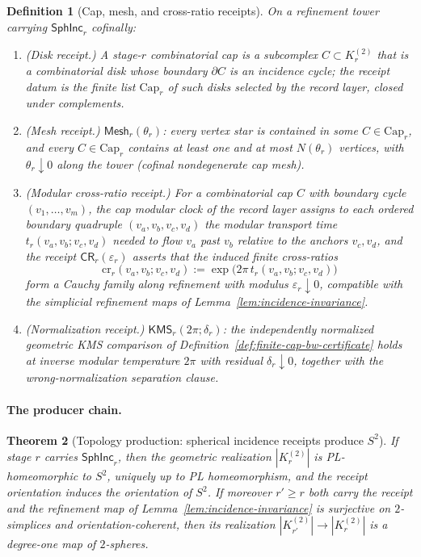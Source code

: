 \documentclass[11pt]{article}
\newtheorem{theorem}{Theorem}[section]
\newtheorem{definition}[theorem]{Definition}
\begin{document}
\begin{definition}[Cap, mesh, and cross-ratio receipts]
\label{def:cap-mesh-crossratio-receipts}
On a refinement tower carrying \(\mathsf{SphInc}_r\) cofinally:
\begin{enumerate}[leftmargin=2em]
\item (\emph{Disk receipt.}) A stage-\(r\) \emph{combinatorial cap} is a
subcomplex \(C\subset K^{(2)}_r\) that is a combinatorial disk whose boundary
\(\partial C\) is an incidence cycle; the receipt datum is the finite list
\(\mathrm{Cap}_r\) of such disks selected by the record layer, closed under
complements.
\item (\emph{Mesh receipt.}) \(\mathsf{Mesh}_r(\theta_r)\): every vertex star
is contained in some \(C\in\mathrm{Cap}_r\), and every \(C\in\mathrm{Cap}_r\)
contains at least one and at most \(N(\theta_r)\) vertices, with
\(\theta_r\downarrow0\) along the tower (cofinal nondegenerate cap mesh).
\item (\emph{Modular cross-ratio receipt.}) For a combinatorial cap \(C\) with
boundary cycle \((v_1,\ldots,v_m)\), the cap modular clock of the record layer
assigns to each ordered boundary quadruple \((v_a,v_b,v_c,v_d)\) the modular
transport time \(t_r(v_a,v_b;v_c,v_d)\) needed to flow \(v_a\) past \(v_b\)
relative to the anchors \(v_c,v_d\), and the receipt
\(\mathsf{CR}_r(\varepsilon_r)\) asserts that the induced finite cross-ratios
\[
\mathrm{cr}_r(v_a,v_b;v_c,v_d):=\exp\bigl(2\pi\,t_r(v_a,v_b;v_c,v_d)\bigr)
\]
form a Cauchy family along refinement with modulus \(\varepsilon_r\downarrow0\),
compatible with the simplicial refinement maps of
Lemma~\ref{lem:incidence-invariance}.
\item (\emph{Normalization receipt.}) \(\mathsf{KMS}_r(2\pi;\delta_r)\): the
independently normalized geometric KMS comparison of
Definition~\ref{def:finite-cap-bw-certificate} holds at inverse modular
temperature \(2\pi\) with residual \(\delta_r\downarrow0\), together with the
wrong-normalization separation clause.
\end{enumerate}
\end{definition}

\paragraph{The producer chain.}

\begin{theorem}[Topology production: spherical incidence receipts produce \(S^2\)]
\label{thm:topology-production}
If stage \(r\) carries \(\mathsf{SphInc}_r\), then the geometric realization
\(|K^{(2)}_r|\) is PL-homeomorphic to \(S^2\), uniquely up to PL homeomorphism,
and the receipt orientation induces the orientation of \(S^2\). If moreover
\(r'\geq r\) both carry the receipt and the refinement map of
Lemma~\ref{lem:incidence-invariance} is surjective on \(2\)-simplices and
orientation-coherent, then its realization
\(|K^{(2)}_{r'}|\to|K^{(2)}_r|\) is a degree-one map of \(2\)-spheres.
\end{theorem}
\end{document}

